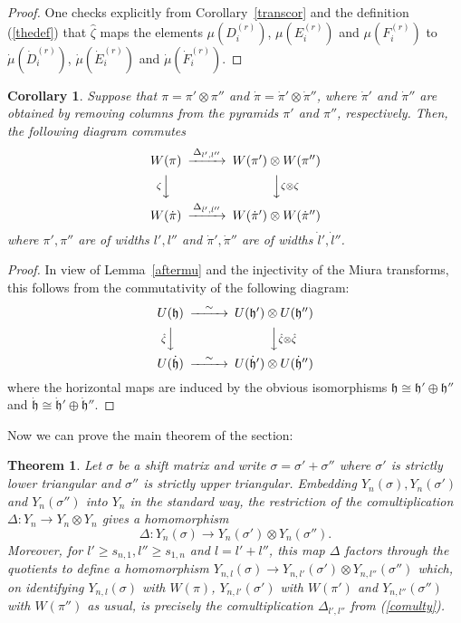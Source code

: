 \documentclass[twoside,12pt,reqno]{amsart}
\newtheorem{Theorem}[Proposition]{Theorem}
\newtheorem{Corollary}[Proposition]{Corollary}
\begin{document}
\begin{proof}
One checks explicitly from Corollary~\ref{transcor} and the definition
(\ref{thedef}) that
$\hat\zeta$ maps the elements
$\mu(D_i^{(r)})$,
$\mu(E_i^{(r)})$ and $\mu(F_i^{(r)})$
to $\dot\mu(\dot D_i^{(r)})$,
$\dot\mu(\dot E_i^{(r)})$ and
$\dot\mu(\dot F_i^{(r)})$.
\end{proof}

\begin{Corollary}\label{stable}
Suppose that $\pi = \pi' \otimes \pi''$ 
and $\dot \pi =\dot\pi' \otimes \dot\pi''$,
where $\dot\pi'$ and $\dot\pi''$ are obtained by removing
columns from the pyramids $\pi'$ and $\pi''$, respectively.
Then, the following diagram commutes
$$
\begin{CD}
W(\pi) &@>\Delta_{l',l''}>> &W(\pi') \otimes W(\pi'')\\
@V\zeta VV&&@VV\zeta \otimes \zeta V\\
W(\dot\pi) &@>\Delta_{\dot l', \dot l''}>> &W(\dot\pi') \otimes W(\dot\pi'')
\end{CD}
$$
where $\pi',\pi''$ are of widths $l',l''$
and $\dot\pi',\dot\pi''$ are of widths
$\dot l', \dot l''$.
\end{Corollary}

\begin{proof}
In view of Lemma~\ref{aftermu} and the injectivity of the Miura
transforms, this follows from the commutativity of the following
diagram:
$$
\begin{CD}
U(\mathfrak{h}) &@>\sim >> &U(\mathfrak{h}') \otimes U(\mathfrak{h}'')\\
@V\hat\zeta VV&&@VV\hat\zeta \otimes \hat\zeta V\\
U(\dot{\mathfrak{h}}) &@>\sim >> &U(\dot{\mathfrak{h}}') \otimes
U(\dot{\mathfrak{h}}'')
\end{CD}
$$
where the horizontal maps are induced by the 
obvious isomorphisms
$\mathfrak{h} \cong \mathfrak{h}' \oplus
\mathfrak{h}''$ and
$\dot{\mathfrak{h}} \cong \dot{\mathfrak{h}}' \oplus
\dot{\mathfrak{h}}''$.
\end{proof}

Now we can prove the main theorem of the section:

\begin{Theorem}\label{grownup}
Let $\sigma$ be a shift matrix and write $\sigma = \sigma'
+ \sigma''$ where $\sigma'$ is strictly lower triangular and
$\sigma''$ is strictly upper triangular. Embedding
$Y_n(\sigma), Y_n(\sigma')$ and $Y_n(\sigma'')$ into $Y_n$
in the standard way, the restriction of the comultiplication
$\Delta:Y_n\rightarrow Y_n \otimes Y_n$ gives a 
homomorphism
$$
\Delta:Y_n(\sigma)\rightarrow Y_n(\sigma') \otimes Y_n(\sigma'').
$$
Moreover, for $l' \geq s_{n,1}, l'' \geq s_{1,n}$ and $l = l' + l''$,
this map $\Delta$ factors through
the quotients to define a homomorphism
$Y_{n,l}(\sigma)
\rightarrow Y_{n,l'}(\sigma') \otimes Y_{n,l''}(\sigma'')$
which, on identifying
$Y_{n,l}(\sigma)$ with $W(\pi)$, 
$Y_{n,l'}(\sigma')$ with $W(\pi')$ and
$Y_{n,l''}(\sigma'')$ with $W(\pi'')$ as usual,
is precisely the comultiplication $\Delta_{l',l''}$
from (\ref{comulty}).
\end{Theorem}
\end{document}

